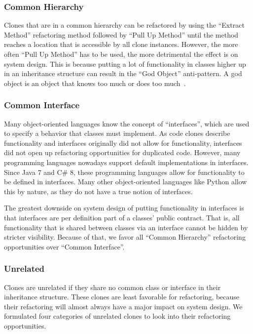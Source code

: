\documentclass[runningheads]{llncs}
\begin{document}
\subsubsection{Common Hierarchy}
Clones that are in a common hierarchy can be refactored by using the ``Extract Method'' refactoring method followed by ``Pull Up Method'' until the method reaches a location that is accessible by all clone instances. However, the more often ``Pull Up Method'' has to be used, the more detrimental the effect is on system design. This is because putting a lot of functionality in classes higher up in an inheritance structure can result in the ``God Object'' anti-pattern. A god object is an object that knows too much or does too much~\cite{fowler2018refactoring}.


\subsubsection{Common Interface}
Many object-oriented languages know the concept of ``interfaces'', which are used to specify a behavior that classes must implement. As code clones describe functionality and interfaces originally did not allow for functionality, interfaces did not open up refactoring opportunities for duplicated code. However, many programming languages nowadays support default implementations in interfaces. Since Java 7 and C\# 8, these programming languages allow for functionality to be defined in interfaces. Many other object-oriented languages like Python allow this by nature, as they do not have a true notion of interfaces.

The greatest downside on system design of putting functionality in interfaces is that interfaces are per definition part of a classes' public contract. That is, all functionality that is shared between classes via an interface cannot be hidden by stricter visibility. Because of that, we favor all ``Common Hierarchy'' refactoring opportunities over ``Common Interface''.


\subsubsection{Unrelated}
Clones are unrelated if they share no common class or interface in their inheritance structure. These clones are least favorable for refactoring, because their refactoring will almost always have a major impact on system design. We formulated four categories of unrelated clones to look into their refactoring opportunities.
\end{document}
